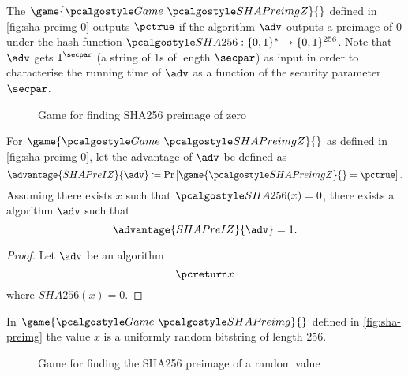 The $\game{\Game~\algo{SHAPreimgZ}}{}$ defined in \autoref{fig:sha-preimg-0} outputs $\pctrue$ if the algorithm $\adv$ outputs a preimage of 0 under the hash function $\algo{SHA256}: \{0, 1\}^* \rightarrow \{0, 1\}^{256}$.
Note that $\adv$ gets $1^{\secpar}$ (a string of 1s of length $\secpar$) as input in order to characterise the running time of $\adv$ as a function of the security parameter $\secpar$.


\begin{figure}[tbhp]
  \begin{center}
    \begin{tcolorbox}[width=5cm]
      \begin{pchstack}[center]
      \end{pchstack}
    \end{tcolorbox}
  \end{center}
  \caption{Game for finding SHA256 preimage of zero \label{fig:sha-preimg-0}}
\end{figure}

\begin{proposition}
 For $\game{\Game~\algo{SHAPreimgZ}}{}$ as defined in \autoref{fig:sha-preimg-0}, let the advantage of $\adv$ be defined as
 \[
  \advantage{SHAPreIZ}{\adv} \defeq \pr{\game{\algo{SHAPreimgZ}}{} = \pctrue}.
 \]
 Assuming there exists $x$ such that $\algo{SHA256}(x) = 0$, there exists a \ppt algorithm $\adv$ such that
  \[
  \advantage{SHAPreIZ}{\adv} = 1.
  \]
\end{proposition}

\begin{proof}
  Let $\adv$ be an algorithm
  \[
   \pcreturn x
  \]
  where $SHA256(x) = 0$.
\end{proof}

In $\game{\Game~\algo{SHAPreimg}}{}$ defined in \autoref{fig:sha-preimg} the value $x$ is a uniformly random bitstring of length $256$.

\begin{figure}[tbhp]
  \begin{center}
    \begin{tcolorbox}[width=5cm]
      \begin{pchstack}[center]
      \end{pchstack}
    \end{tcolorbox}
  \end{center}
  \caption{Game for finding the SHA256 preimage of a random value \label{fig:sha-preimg}}
\end{figure}

